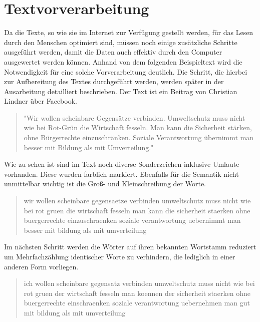 \section{Textvorverarbeitung}

Da die Texte, so wie sie im Internet zur Verfügung gestellt werden, für das Lesen durch den Menschen optimiert sind, müssen noch einige zusätzliche Schritte ausgeführt werden, damit die Daten auch effektiv durch den Computer ausgewertet werden können. Anhand von dem folgenden Beispieltext wird die Notwendigkeit für eine solche Vorverarbeitung deutlich. Die Schritt, die hierbei zur Aufbereitung des Textes durchgeführt werden, werden später in der Ausarbeitung detailliert beschrieben. Der Text ist ein Beitrag von Christian Lindner über Facebook.
\newline
\begin{quote}
\colorbox{rahmen}{"Wir} wollen scheinbare \colorbox{rahmen}{Gegensätze} verbinden\colorbox{rahmen}{. Umweltschutz} muss nicht wie bei \colorbox{rahmen}{Rot-Grün} die \colorbox{rahmen}{Wirtschaft} fesseln\colorbox{rahmen}{. Man} kann die \colorbox{rahmen}{Sicherheit stärken}, ohne \colorbox{rahmen}{Bürgerrechte einzuschränken. Soziale Verantwortung übernimmt} man besser mit \colorbox{rahmen}{Bildung} als mit \colorbox{rahmen}{Umverteilung.}"
\end{quote}

Wie zu sehen ist sind im Text noch diverse Sonderzeichen inklusive Umlaute vorhanden. Diese wurden farblich markiert. Ebenfalls für die Semantik nicht unmittelbar wichtig ist die Groß- und Kleinschreibung der Worte.
\newline

\begin{quote}
\colorbox{rahmen}{wir} wollen scheinbare \colorbox{rahmen}{gegensaetze} verbinden umweltschutz muss nicht wie bei rot gruen \colorbox{rahmen}{die} wirtschaft fesseln man \colorbox{rahmen}{kann die} sicherheit staerken ohne buergerrechte einzuschraenken soziale verantwortung \colorbox{rahmen}{uebernimmt} man \colorbox{rahmen}{besser} mit bildung als mit umverteilung
\end{quote}

Im nächsten Schritt werden die Wörter auf ihren bekannten Wortstamm reduziert um Mehrfachzählung identischer Worte zu verhindern, die lediglich in einer anderen Form vorliegen. 
\newline
\begin{quote}
\colorbox{rahmen}{ich} wollen scheinbare gegensatz verbinden umweltschutz muss nicht \colorbox{rahmen}{wie} bei rot gruen \colorbox{rahmen}{der} wirtschaft fesseln \colorbox{rahmen}{man} koennen \colorbox{rahmen}{der} sicherheit staerken \colorbox{rahmen}{ohne} buergerrechte einschraenken soziale verantwortung uebernehmen \colorbox{rahmen}{man} gut \colorbox{rahmen}{mit} bildung \colorbox{rahmen}{als mit} umverteilung
\end{quote}

